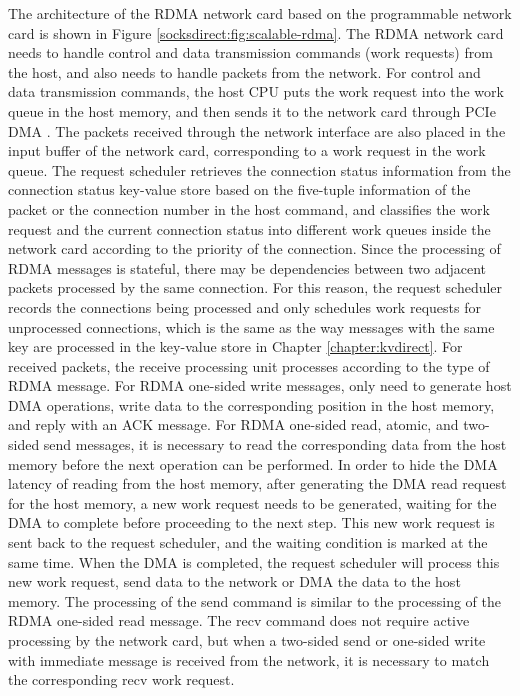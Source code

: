 The architecture of the RDMA network card based on the programmable network card is shown in Figure \ref{socksdirect:fig:scalable-rdma}. The RDMA network card needs to handle control and data transmission commands (work requests) from the host, and also needs to handle packets from the network. For control and data transmission commands, the host CPU puts the work request into the work queue in the host memory, and then sends it to the network card through PCIe DMA \cite{kalia2016design}. The packets received through the network interface are also placed in the input buffer of the network card, corresponding to a work request in the work queue. The request scheduler retrieves the connection status information from the connection status key-value store based on the five-tuple information of the packet or the connection number in the host command, and classifies the work request and the current connection status into different work queues inside the network card according to the priority of the connection. Since the processing of RDMA messages is stateful, there may be dependencies between two adjacent packets processed by the same connection. For this reason, the request scheduler records the connections being processed and only schedules work requests for unprocessed connections, which is the same as the way messages with the same key are processed in the key-value store in Chapter \ref{chapter:kvdirect}. For received packets, the receive processing unit processes according to the type of RDMA message. For RDMA one-sided write messages, only need to generate host DMA operations, write data to the corresponding position in the host memory, and reply with an ACK message. For RDMA one-sided read, atomic, and two-sided send messages, it is necessary to read the corresponding data from the host memory before the next operation can be performed. In order to hide the DMA latency of reading from the host memory, after generating the DMA read request for the host memory, a new work request needs to be generated, waiting for the DMA to complete before proceeding to the next step. This new work request is sent back to the request scheduler, and the waiting condition is marked at the same time. When the DMA is completed, the request scheduler will process this new work request, send data to the network or DMA the data to the host memory. The processing of the send command is similar to the processing of the RDMA one-sided read message. The recv command does not require active processing by the network card, but when a two-sided send or one-sided write with immediate message is received from the network, it is necessary to match the corresponding recv work request.

